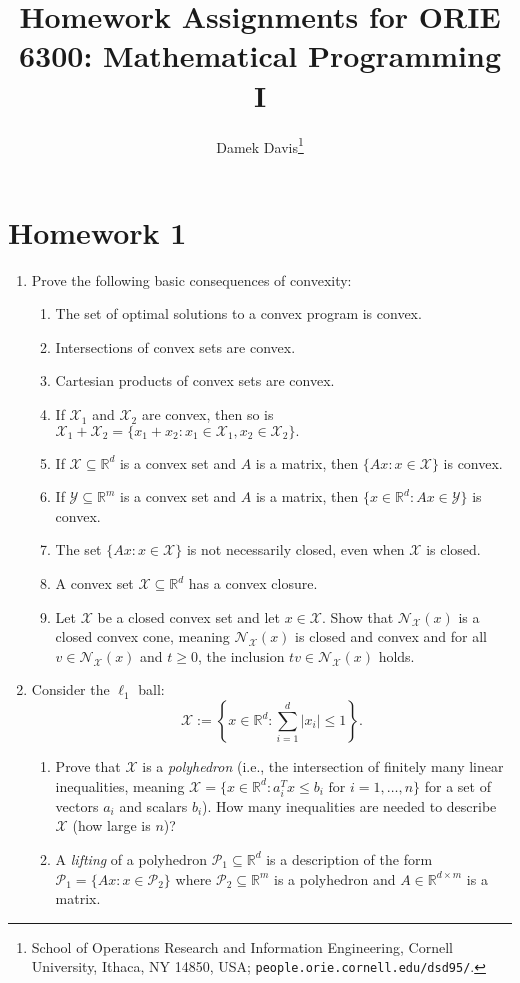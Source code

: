 \documentclass[12pt]{article}
\numberwithin{equation}{section}
\newcommand{\RR}{\mathbb{R}}
\newcommand{\cX}{\mathcal{X}}
\newcommand{\cY}{\mathcal{Y}}
\newcommand{\cP}{\mathcal{P}}
\newcommand{\cN}{\mathcal{N}}
\theoremstyle{remark}
\begin{document}
	
	\title{Homework Assignments for ORIE 6300: Mathematical Programming I}
	\author{Damek Davis\thanks{School of Operations Research and Information Engineering, Cornell University,
Ithaca, NY 14850, USA;
\texttt{people.orie.cornell.edu/dsd95/}.}}	
	

	
	
	\date{}
	\maketitle
	\newpage
\section{Homework 1}

\begin{enumerate}
\item Prove the following basic consequences of convexity:
\begin{enumerate}[noitemsep]
\item The set of optimal solutions to a convex program is convex.
\item Intersections of convex sets are convex. 
\item Cartesian products of convex sets are convex. 
\item If $\cX_1$ and $\cX_2$ are convex, then so is $\cX_1 + \cX_2 = \{ x_1 + x_2 \colon x_1 \in \cX_1, x_2 \in \cX_2\}.$
\item If $\cX\subseteq \RR^d $ is a convex set and $A$ is a matrix, then $\{Ax \colon x \in \cX\}$ is convex. 
\item If $\cY\subseteq \RR^m$ is a convex set and $A$ is a matrix, then $\{x \in \RR^d \colon Ax \in \cY\}$ is convex. 
\item The set $\{Ax \colon x \in \cX\}$ is  not necessarily closed, even when $\cX$ is closed.
\item A convex set $\cX \subseteq\RR^d$ has a convex closure.
\item Let $\cX$ be a closed convex set and let $x \in \cX$. 
Show that $\cN_{\cX}(x)$ is a closed convex cone, 
meaning $\cN_{\cX}(x)$ is 
closed 
	and 
convex 
		and 
	for all $v \in \cN_{\cX}(x)$ and $t \geq 0$, the inclusion $tv \in \cN_{\cX}(x)$ holds.
\end{enumerate}
\item Consider the $\ell_1$ ball:
$$
\cX := \left\{ x \in \RR^d \colon  \sum_{i=1}^d |x_i| \leq 1\right\}.
$$
\begin{enumerate}
\item Prove that $\cX$ is a \emph{polyhedron} (i.e., the intersection of finitely many linear inequalities, meaning $\cX = \{ x \in \RR^d \colon a_i^T x \leq b_i \text{ for $i = 1, \ldots, n$}\}$ for a set of vectors $a_i$ and scalars $b_i$). How many inequalities are needed to describe $\cX$ (how large is $n$)?
\item A \emph{lifting} of a polyhedron $\cP_1 \subseteq \RR^d$ is a description of the form $\cP_1 = \{Ax \colon x \in \cP_2\}$ where $\cP_2 \subseteq \RR^m$ is a polyhedron and $A \in \RR^{d \times m}$ is a matrix.  


\end{enumerate}
\end{enumerate}
\end{document}

